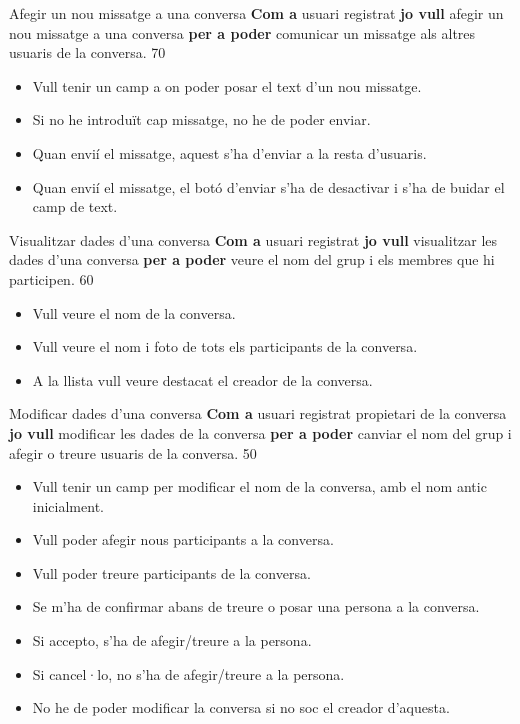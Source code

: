 \pintaHistoria
    {Afegir un nou missatge a una conversa}
    {\textbf{Com a} usuari registrat \textbf{jo vull} afegir un nou missatge a una conversa \textbf{per a poder} comunicar un missatge als altres usuaris de la conversa.}
    {70}
    {
    \begin{itemize}[leftmargin=0.3cm]
        \item Vull tenir un camp a on poder posar el text d'un nou missatge.
        \item Si no he introduït cap missatge, no he de poder enviar.
        \item Quan envií el missatge, aquest s'ha d'enviar a la resta d'usuaris.
        \item Quan envií el missatge, el botó d'enviar s'ha de desactivar i s'ha de buidar el camp de text.
    \end{itemize}
    }

\pintaHistoria
    {Visualitzar dades d'una conversa}
    {\textbf{Com a} usuari registrat \textbf{jo vull} visualitzar les dades d'una conversa \textbf{per a poder} veure el nom del grup i els membres que hi participen.}
    {60}
    {
    \begin{itemize}[leftmargin=0.3cm]
        \item Vull veure el nom de la conversa.
        \item Vull veure el nom i foto de tots els participants de la conversa.
        \item A la llista vull veure destacat el creador de la conversa.
    \end{itemize}
    }

\pintaHistoria
    {Modificar dades d'una conversa}
    {\textbf{Com a} usuari registrat propietari de la conversa \textbf{jo vull} modificar les dades de la conversa \textbf{per a poder} canviar el nom del grup i afegir o treure usuaris de la conversa.}
    {50}
    {
    \begin{itemize}[leftmargin=0.3cm]
        \item Vull tenir un camp per modificar el nom de la conversa, amb el nom antic inicialment.
        \item Vull poder afegir nous participants a la conversa.
        \item Vull poder treure participants de la conversa.
        \item Se m'ha de confirmar abans de treure o posar una persona a la conversa.
        \item Si accepto, s'ha de afegir/treure a la persona.
        \item Si cancel·lo, no s'ha de afegir/treure a la persona.
        \item No he de poder modificar la conversa si no soc el creador d'aquesta.
    \end{itemize}
    }

